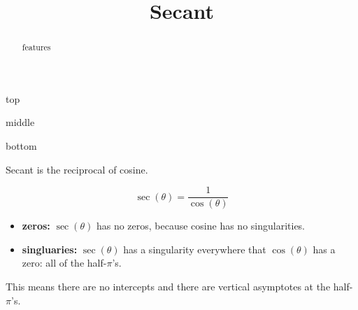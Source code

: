 \documentclass{ximera}
\title{Secant}
\begin{document}
\begin{abstract}
features
\end{abstract}
\maketitle




top


middle


bottom




Secant is the reciprocal of cosine. 

\[   \sec(\theta)  =  \frac{1}{\cos(\theta)}  \]



\begin{itemize}
\item \textbf{zeros:} $\sec(\theta)$ has no zeros, because cosine has no singularities.
\item \textbf{singluaries:} $\sec(\theta)$ has a singularity everywhere that $\cos(\theta)$ has a zero:  all of the half-$\pi$'s.
\end{itemize}

This means there are no intercepts and there are vertical asymptotes at the half-$\pi$'s.
\end{document}

